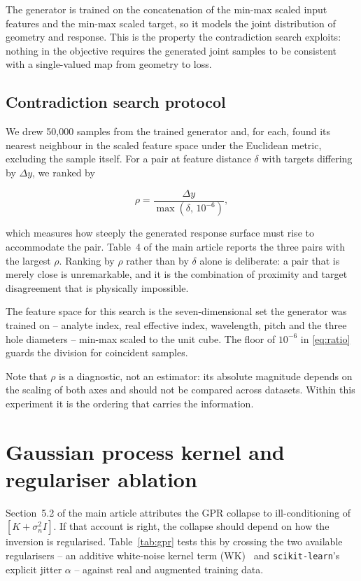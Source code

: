 \documentclass[pdflatex,sn-basic,Numbered]{sn-jnl}
\begin{document}
The generator is trained on the concatenation of the min-max scaled input
features and the min-max scaled target, so it models the joint distribution of
geometry and response. This is the property the contradiction search exploits:
nothing in the objective requires the generated joint samples to be consistent
with a single-valued map from geometry to loss.

\subsection{Contradiction search protocol}

We drew 50,000 samples from the trained generator and, for each, found its
nearest neighbour in the scaled feature space under the Euclidean metric,
excluding the sample itself. For a pair at feature distance $\delta$ with
targets differing by $\Delta y$, we ranked by

\begin{equation}
\rho = \frac{\Delta y}{\max(\delta,\, 10^{-6})},
\label{eq:ratio}
\end{equation}

which measures how steeply the generated response surface must rise to
accommodate the pair. Table~4 of the main article reports the three pairs with
the largest $\rho$. Ranking by $\rho$ rather than by $\delta$ alone is
deliberate: a pair that is merely close is unremarkable, and it is the
combination of proximity and target disagreement that is physically
impossible.

The feature space for this search is the seven-dimensional set the generator was
trained on -- analyte index, real effective index, wavelength, pitch and the
three hole diameters -- min-max scaled to the unit cube. The floor of $10^{-6}$
in \eqref{eq:ratio} guards the division for coincident samples.

Note that $\rho$ is a diagnostic, not an estimator: its absolute magnitude
depends on the scaling of both axes and should not be compared across datasets.
Within this experiment it is the ordering that carries the information.

\section{Gaussian process kernel and regulariser ablation}\label{sup:gpr}

Section~5.2 of the main article attributes the GPR collapse to
ill-conditioning of $[K + \sigma_n^{2}I]$. If that account is right, the
collapse should depend on how the inversion is regularised. Table~\ref{tab:gpr}
tests this by crossing the two available regularisers -- an additive white-noise
kernel term (WK)~\cite{rasmussen2006} and \texttt{scikit-learn}'s explicit
jitter $\alpha$ -- against real and augmented training data.
\end{document}

